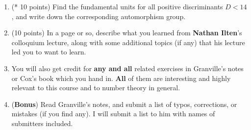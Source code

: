 \documentclass[12pt]{article}
\begin{document}
\begin{enumerate}
\item (* 10 points)
Find the fundamental units for all positive discriminants $D < 14$, and write down the corresponding automorphism group.

\item (10 points)
In a page or so, describe what you learned from {\bf Nathan Ilten}'s colloquium lecture, along with some
additional topics (if any) that his lecture led you to want to learn.

\item
You will also get credit for {\bf any and all} related exercises in Granville's notes or Cox's book which you hand in.
{\bf All} of them are interesting and highly relevant to this course and to number theory in general.

\item ({\bf Bonus})
Read Granville's notes, and submit a list of typos, corrections, or mistakes (if you find any). I will submit a list
to him with names of submitters included.

\end{enumerate}
\end{document}
